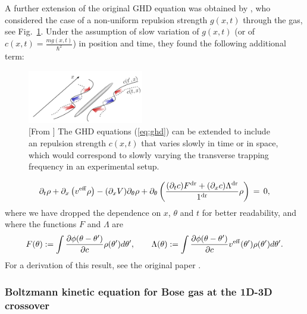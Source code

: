\documentclass[onecolumn,amsfonts,showpacs,superscriptaddress]{revtex4-1}
\begin{document}
A further extension of the original GHD equation was obtained by \cite{bastianello2019generalized}, who considered the case of a non-uniform repulsion strength $g(x,t)$ through the gas, see Fig.~\ref{fig:spacetime_interactions}. Under the assumption of slow variation of $g(x,t)$ (or of $c(x,t) = \frac{m g(x,t)}{\hbar^2}$) in position and time, they found the following additional term:
\begin{figure}
    \centering
    \includegraphics[width=0.45\textwidth]{figures/spacetime_interactions.png}
    \caption{[From \citep{bastianello2019generalized}] The GHD equations (\ref{eq:ghd}) can be extended to include an repulsion strength $c(x,t)$ that varies slowly in time or in space, which would correspond to slowly varying the transverse trapping frequency in an experimental setup.}
    \label{fig:spacetime_interactions}
\end{figure}
\begin{equation}
    \label{eq:inhomogeneous_interaction}
    \partial_t \rho + \partial_x \left( v^{\rm eff} \rho \right) - (\partial_x V) \partial_\theta \rho  + \partial_\theta \left(  \frac{(\partial_t c) F^{\rm dr} + (\partial_x c) \Lambda^{\rm dr} }{1^{\rm dr}}  \rho \right)  \, = \, 0,
\end{equation}
where we have dropped the dependence on $x$, $\theta$ and $t$ for better readability, and where the functions $F$ and $\Lambda$ are
$$
  F(\theta) := \int  \frac{\partial  \phi(\theta-\theta')}{\partial c} \rho(\theta') d\theta' , \qquad   \Lambda(\theta) := \int  \frac{\partial  \phi(\theta-\theta')}{\partial c}  v^{\rm eff}(\theta') \rho(\theta') d \theta' .
$$
For a derivation of this result, see the original paper \citep{bastianello2019generalized}.





\subsubsection{Boltzmann kinetic equation for Bose gas at the 1D-3D crossover}
\end{document}
